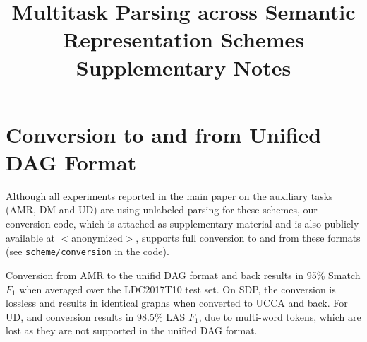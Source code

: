 \documentclass[11pt,a4paper]{article}
\title{Multitask Parsing across Semantic Representation Schemes \\ Supplementary Notes}
\begin{document}
\maketitle

\appendix

\section{Conversion to and from Unified DAG Format}\label{sec:convert}

Although all experiments reported in the main paper on the auxiliary tasks
(AMR, DM and UD) are using unlabeled parsing for these schemes,
our conversion code,
which is attached as supplementary material and is also publicly available at $<$anonymized$>$,
supports full conversion to and from these formats (see \texttt{scheme/conversion} in the code).

Conversion from AMR to the unifid DAG format and back
results in 95\% Smatch $F_1$ \cite{cai2013smatch} when averaged over the
LDC2017T10 test set.
On SDP, the conversion is lossless and results in identical graphs
when converted to UCCA and back.
For UD, and conversion results in 98.5\% LAS $F_1$, due to multi-word tokens,
which are lost as they are not supported in the unified DAG format.
\end{document}
